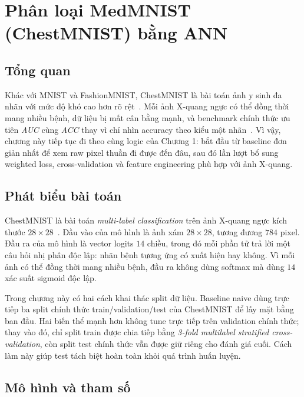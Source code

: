 \chapter{Phân loại MedMNIST (ChestMNIST) bằng ANN}

\section{Tổng quan}

Khác với MNIST và FashionMNIST, ChestMNIST là bài toán ảnh y sinh đa nhãn với mức độ khó cao hơn rõ rệt~\cite{yang2022medmnistv2}. Mỗi ảnh X-quang ngực có thể đồng thời mang nhiều bệnh, dữ liệu bị mất cân bằng mạnh, và benchmark chính thức ưu tiên \textit{AUC} cùng \textit{ACC} thay vì chỉ nhìn accuracy theo kiểu một nhãn~\cite{medmnist_site}. Vì vậy, chương này tiếp tục đi theo cùng logic của Chương 1: bắt đầu từ baseline đơn giản nhất để xem raw pixel thuần đi được đến đâu, sau đó lần lượt bổ sung weighted loss, cross-validation và feature engineering phù hợp với ảnh X-quang.

\section{Phát biểu bài toán}

ChestMNIST là bài toán \textit{multi-label classification} trên ảnh X-quang ngực kích thước $28 \times 28$~\cite{yang2022medmnistv2}. Đầu vào của mô hình là ảnh xám $28 \times 28$, tương đương $784$ pixel. Đầu ra của mô hình là vector logits $14$ chiều, trong đó mỗi phần tử trả lời một câu hỏi nhị phân độc lập: nhãn bệnh tương ứng có xuất hiện hay không. Vì mỗi ảnh có thể đồng thời mang nhiều bệnh, đầu ra không dùng softmax mà dùng $14$ xác suất sigmoid độc lập.

Trong chương này có hai cách khai thác split dữ liệu. Baseline naive dùng trực tiếp ba split chính thức train/validation/test của ChestMNIST để lấy mặt bằng ban đầu. Hai biến thể mạnh hơn không tune trực tiếp trên validation chính thức; thay vào đó, chỉ split train được chia tiếp bằng \textit{3-fold multilabel stratified cross-validation}, còn split test chính thức vẫn được giữ riêng cho đánh giá cuối. Cách làm này giúp test tách biệt hoàn toàn khỏi quá trình huấn luyện.



\section{Mô hình và tham số}
